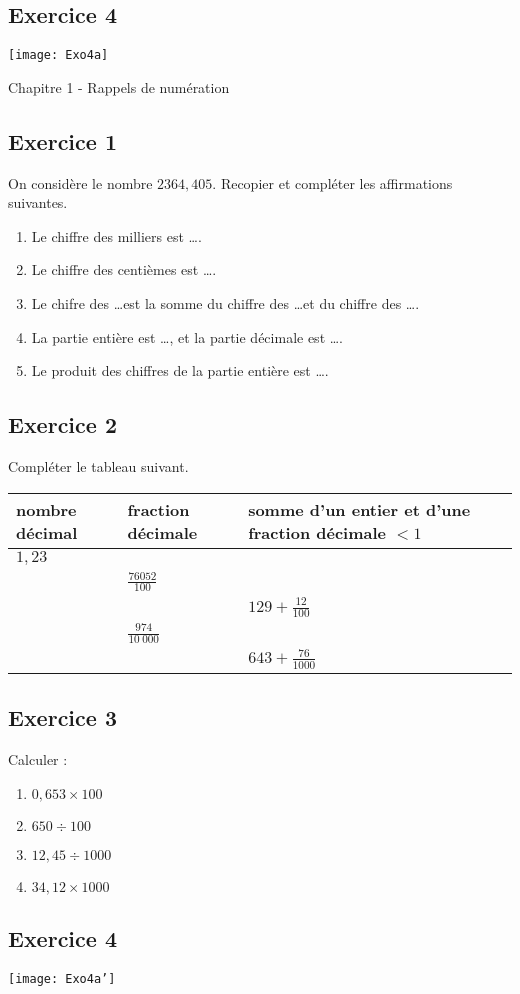 \documentclass[12 pt]{extarticle}
\theoremstyle{plain}
\begin{document}
\subsection*{Exercice 4}
\texttt{[image: Exo4a]}


\newpage


\begin{center}{\Large Chapitre 1 - Rappels de  numération}\\ 
 \end{center}
 
 \subsection*{Exercice 1}
On considère le nombre $2364,405$. Recopier et compléter les affirmations suivantes. 
 \begin{enumerate}
 \item Le chiffre des milliers est \ldots.
 \item Le chiffre des centièmes est \ldots. 
 \item Le chifre des \ldots est la somme du chiffre des \ldots et du chiffre des \ldots. 
 \item La partie entière est \ldots, et la partie décimale est \ldots. 
 \item Le produit des chiffres de la partie entière est \ldots. 
 \end{enumerate}

\subsection*{Exercice 2}

Compléter le tableau suivant. 

\renewcommand{\arraystretch}{2}
\begin{tabular}[height = 15 pt]{|l|l|l|l|}
\hline 
nombre décimal & fraction décimale  & somme d'un entier et d'une fraction décimale $<1$\\ \hline
$1,23$ &  &  \\
\hline 
 &  $\displaystyle\frac{76052}{100}$ &  \\
\hline 
 &  & $\displaystyle129 + \frac{12}{100}$   \\
\hline 
 &  $\displaystyle\frac{974}{10\ 000}$ &  \\
\hline 
 &  & $\displaystyle643 + \frac{76}{1000}$   \\
\hline
\end{tabular}

\subsection*{Exercice 3}

Calculer : \begin{enumerate}
\item $0,653 \times 100$
\item $650 \div 100$
\item $12, 45 \div 1000$
\item $ 34,12 \times 1000$
\end{enumerate}

\subsection*{Exercice 4}
\texttt{[image: Exo4a']}
 	
\end{document}
